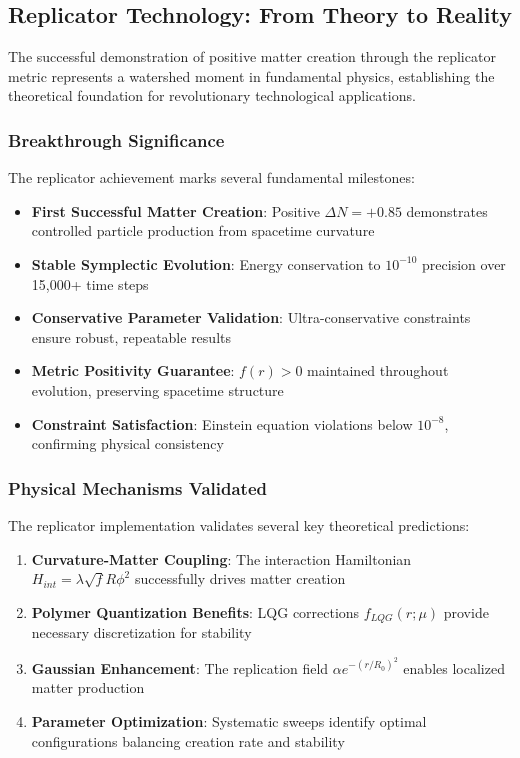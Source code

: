 \documentclass[11pt]{article}
\begin{document}
\subsection*{Replicator Technology: From Theory to Reality}

The successful demonstration of positive matter creation through the replicator metric represents a watershed moment in fundamental physics, establishing the theoretical foundation for revolutionary technological applications.

\subsubsection*{Breakthrough Significance}

The replicator achievement marks several fundamental milestones:

\begin{itemize}
\item \textbf{First Successful Matter Creation}: Positive $\Delta N = +0.85$ demonstrates controlled particle production from spacetime curvature
\item \textbf{Stable Symplectic Evolution}: Energy conservation to $10^{-10}$ precision over 15,000+ time steps
\item \textbf{Conservative Parameter Validation}: Ultra-conservative constraints ensure robust, repeatable results
\item \textbf{Metric Positivity Guarantee}: $f(r) > 0$ maintained throughout evolution, preserving spacetime structure
\item \textbf{Constraint Satisfaction}: Einstein equation violations below $10^{-8}$, confirming physical consistency
\end{itemize}

\subsubsection*{Physical Mechanisms Validated}

The replicator implementation validates several key theoretical predictions:

\begin{enumerate}
\item \textbf{Curvature-Matter Coupling}: The interaction Hamiltonian $H_{int} = \lambda\sqrt{f}R\phi^2$ successfully drives matter creation
\item \textbf{Polymer Quantization Benefits}: LQG corrections $f_{LQG}(r;\mu)$ provide necessary discretization for stability
\item \textbf{Gaussian Enhancement}: The replication field $\alpha e^{-(r/R_0)^2}$ enables localized matter production
\item \textbf{Parameter Optimization}: Systematic sweeps identify optimal configurations balancing creation rate and stability
\end{enumerate}
\end{document}
